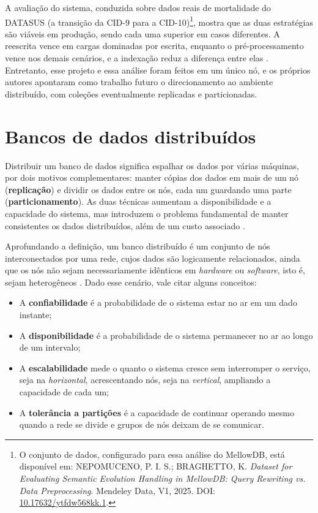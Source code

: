 A avaliação do sistema, conduzida sobre dados reais de mortalidade do DATASUS (a transição da CID-9 para a CID-10)\footnote{O conjunto de dados, configurado para essa análise do MellowDB, está disponível em: NEPOMUCENO, P. I. S.; BRAGHETTO, K. \textit{Dataset for Evaluating Semantic Evolution Handling in MellowDB: Query Rewriting vs. Data Preprocessing}. Mendeley Data, V1, 2025. DOI: \url{10.17632/ytfdw568kk.1}.}, mostra que as duas estratégias são viáveis em produção, sendo cada uma superior em casos diferentes. A reescrita vence em cargas dominadas por escrita, enquanto o pré-processamento vence nos demais cenários, e a indexação reduz a diferença entre elas \citep{nepomuceno2026}. Entretanto, esse projeto e essa análise foram feitos em um único nó, e os próprios autores apontaram como trabalho futuro o direcionamento ao ambiente distribuído, com coleções eventualmente replicadas e particionadas.

\section{Bancos de dados distribuídos}
\label{sec:distribuidos}

Distribuir um banco de dados significa espalhar os dados por várias máquinas, por dois motivos complementares: manter cópias dos dados em mais de um nó (\textbf{replicação}) e dividir os dados entre os nós, cada um guardando uma parte (\textbf{particionamento}). As duas técnicas aumentam a disponibilidade e a capacidade do sistema, mas introduzem o problema fundamental de manter consistentes os dados distribuídos, além de um custo associado \citep{elmasri2017, ozsu2020}.

Aprofundando a definição, um banco distribuído é um conjunto de nós interconectados por uma rede, cujos dados são logicamente relacionados, ainda que os nós não sejam necessariamente idênticos em \textit{hardware} ou \textit{software}, isto é, sejam heterogêneos \citep{elmasri2017}. Dado esse cenário, vale citar alguns conceitos:

\begin{itemize}
  \item A \textbf{confiabilidade} é a probabilidade de o sistema estar no ar em um dado instante;
  \item A \textbf{disponibilidade} é a probabilidade de o sistema permanecer no ar ao longo de um intervalo;
  \item A \textbf{escalabilidade} mede o quanto o sistema cresce sem interromper o serviço, seja na \textit{horizontal}, acrescentando nós, seja na \textit{vertical}, ampliando a capacidade de cada um;
  \item A \textbf{tolerância a partições} é a capacidade de continuar operando mesmo quando a rede se divide e grupos de nós deixam de se comunicar.
\end{itemize}

